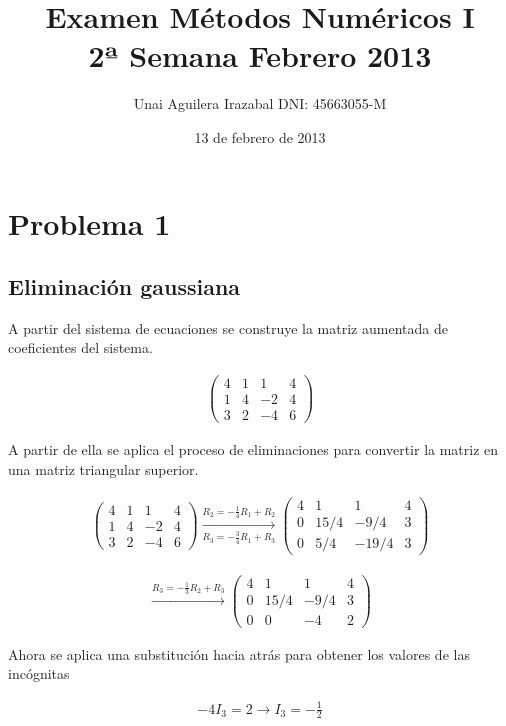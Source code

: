 \documentclass[a4paper, 12pt]{article}
\title{Examen Métodos Numéricos I \\ 2ª Semana Febrero 2013}
\author{Unai Aguilera Irazabal DNI: 45663055-M}
\date{13 de febrero de 2013}
\begin{document}
\maketitle

\section*{Problema 1}
\subsection*{Eliminación gaussiana}
A partir del sistema de ecuaciones se construye la matriz aumentada de
coeficientes del sistema.

\begin{align*}
\begin{pmatrix}
  4 & 1 & 1 & 4\\
  1 & 4 & -2 & 4 \\
  3 & 2 & -4 & 6
\end{pmatrix}
\end{align*}

A partir de ella se aplica el proceso de eliminaciones para convertir la 
matriz en una matriz triangular superior.

\begin{align*}
\begin{pmatrix}
  4 & 1 & 1 & 4\\
  1 & 4 & -2 & 4 \\
  3 & 2 & -4 & 6
\end{pmatrix} 
\xrightarrow[R_3 = -\frac{3}{4}R_1 + R_3]{R_2 = -\frac{1}{4}R_1 + R_2}
\begin{pmatrix}
  4 & 1 & 1 & 4\\
  0 & 15/4 & -9/4 & 3 \\
  0 & 5/4 & -19/4 & 3
\end{pmatrix}
\end{align*}

\begin{align*}
\xrightarrow{R_3 = -\frac{1}{3}R_2 + R_3}
\begin{pmatrix}
  4 & 1 & 1 & 4\\
  0 & 15/4 & -9/4 & 3 \\
  0 & 0 & -4 & 2
\end{pmatrix}
\end{align*}

Ahora se aplica una substitución hacia atrás para obtener los valores de las
incógnitas

\begin{align*}
-4I_3 = 2
\rightarrow
I_3 = -\frac{1}{2}
\end{align*}
\end{document}
